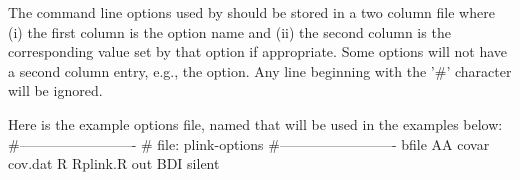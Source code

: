 
\startsubsubject[title={Specifying common \PLINK command line options}]

The command line options used by \PLINK should be stored in a two column file where 
(i) the first column is the option name and 
(ii) the second column is the corresponding value set by that option if appropriate.
Some options will not have a second column entry, e.g., the  option.
Any line beginning with the '\#' character will be ignored.

Here is the example options file, named 
that will be used in the examples below:
\startSTDOUT
#-------------------------
# file:  plink-options
#-------------------------
bfile    AA
covar    cov.dat
R        Rplink.R
out      BDI
silent
\stopSTDOUT

\stopsubsubject

\endinput
